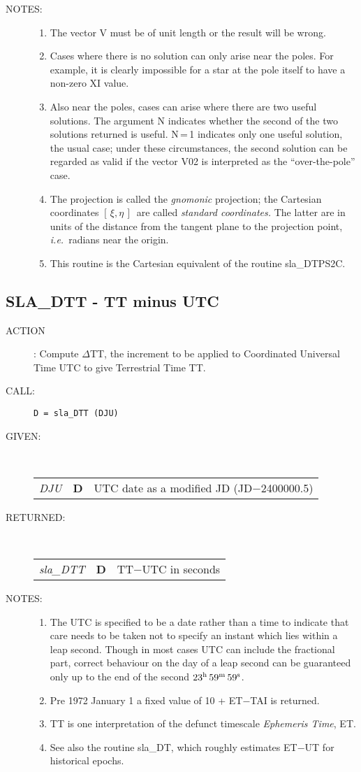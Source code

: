\documentclass[11pt,twoside]{article}
\newcommand{\xlabel}[1]{}
\newcommand{\xieta}     {$[\,\xi,\eta\,]$}
\newcommand{\routine}[3]
{\hbadness=10000
  \vbox
  {
    \rule{\textwidth}{0.3mm}\\
    {\Large {\bf #1} \hfill #2 \hfill {\bf #1}}\\
    \setlength{\oldspacing}{\topsep}
    \setlength{\topsep}{0.3ex}
    \begin{description}
      #3
    \end{description}
    \setlength{\topsep}{\oldspacing}
  }
}
\renewcommand{\routine}[3]
   {
      \subsection{#1\xlabel{#1} - #2\label{#1}}
       \begin{description}
         #3
       \end{description}
   }
\newcommand{\action}[1]
{\item[ACTION]: #1}
\newcommand{\action}[1]
   {\item[ACTION:] #1}
\newcommand{\call}[1]
{\item[CALL]: \hspace{0.4em}{\tt #1}}
\newlength{\oldspacing}
\renewcommand{\call}[1]
   {
    \item[CALL:] {\tt #1}
   }
\newcommand{\args}[2]
{
  \goodbreak
  \setlength{\oldspacing}{\topsep}
  \setlength{\topsep}{0.3ex}
  \begin{description}
  \item[#1]:\\[1.5ex]
    \begin{tabular}{p{7em}p{6em}p{22em}}
      #2
    \end{tabular}
  \end{description}
  \setlength{\topsep}{\oldspacing}
}
\renewcommand{\args}[2]
   {
     \begin{description}
        \item[#1:]\\
        \begin{tabular}{p{7em}p{6em}l}
           #2
        \end{tabular}
     \end{description}
   }
\newcommand{\spec}[3]
{
  {\em {#1}} & {\bf \mbox{#2}} & {#3}
}
\newcommand{\notes}[1]
{
  \goodbreak
  \setlength{\oldspacing}{\topsep}
  \setlength{\topsep}{0.3ex}
  \begin{description}
    \item[NOTES]:
        #1
  \end{description}
  \setlength{\topsep}{\oldspacing}
}
\renewcommand{\notes}[1]
   {
      \begin{description}
         \item[NOTES:]
            #1
      \end{description}
   }
\begin{document}
\notes
{
 \begin{enumerate}
  \item The vector V must be of unit length or the result will be wrong.
  \item Cases where there is no solution can only arise near the poles.
        For example, it is clearly impossible for a star at the pole
        itself to have a non-zero XI value.
  \item Also near the poles, cases can arise where there are two useful
        solutions.  The argument N indicates whether the second of the
        two solutions returned is useful.
        N\,=\,1
        indicates only one useful solution, the usual case;  under these
        circumstances, the second solution can be regarded as valid if
        the vector V02 is interpreted as the ``over-the-pole'' case.
  \item The projection is called the {\it gnomonic}\/ projection;  the
        Cartesian coordinates \xieta\ are called
        {\it standard coordinates.}\/  The latter
        are in units of the distance from the tangent plane to the projection
        point, {\it i.e.}\ radians near the origin.
  \item This routine is the Cartesian equivalent of the routine sla\_DTPS2C.
 \end{enumerate}
}
\routine{SLA\_DTT}{TT minus UTC}
{
 \action{Compute $\Delta$TT, the increment to be applied to
         Coordinated Universal Time UTC to give
         Terrestrial Time TT.}
 \call{D~=~sla\_DTT (DJU)}
}
\args{GIVEN}
{
 \spec{DJU}{D}{UTC date as a modified JD (JD$-$2400000.5)}
}
\args{RETURNED}
{
 \spec{sla\_DTT}{D}{TT$-$UTC in seconds}
}
\notes
{
 \begin{enumerate}
  \item The UTC is specified to be a date rather than a time to indicate
        that care needs to be taken not to specify an instant which lies
        within a leap second.  Though in most cases UTC can include the
        fractional part, correct behaviour on the day of a leap second
        can be guaranteed only up to the end of the second
        $23^{\rm h}\,59^{\rm m}\,59^{\rm s}$.
  \item Pre 1972 January 1 a fixed value of 10 + ET$-$TAI is returned.
  \item TT is one interpretation of the defunct timescale
        {\it Ephemeris Time}, ET.
  \item See also the routine sla\_DT, which roughly estimates ET$-$UT for
        historical epochs.
 \end{enumerate}
}
\end{document}

